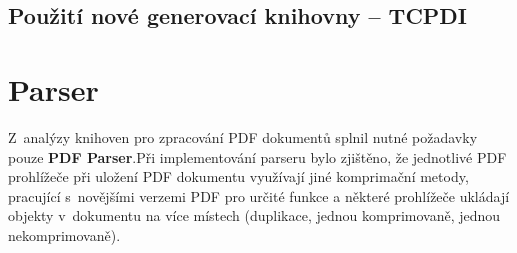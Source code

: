 \subsection{Použití nové generovací knihovny -- TCPDI}

\section{Parser}
Z~analýzy knihoven pro zpracování PDF dokumentů splnil nutné požadavky pouze \textbf{PDF Parser}.Při implementování parseru bylo zjištěno, že jednotlivé PDF prohlížeče při uložení PDF dokumentu využívají jiné komprimační metody, pracující s~novějšími verzemi PDF pro určité funkce a některé prohlížeče ukládají objekty v~dokumentu na více místech (duplikace, jednou komprimovaně, jednou nekomprimovaně).

